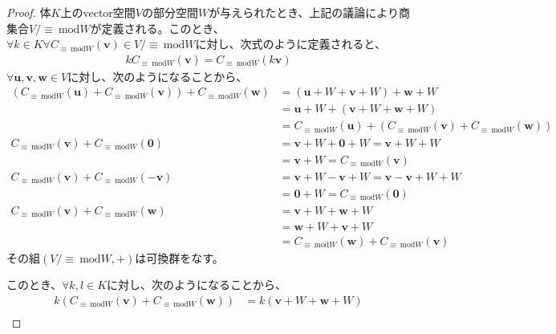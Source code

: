\documentclass[dvipdfmx]{jsarticle}
\begin{document}
\begin{proof}
体$K$上のvector空間$V$の部分空間$W$が与えられたとき、上記の議論により商集合${V}/{\equiv \ \mathrm{mod}W}$が定義される。このとき、$\forall k \in K\forall C_{\equiv \ \mathrm{mod}W}\left( \mathbf{v} \right) \in {V}/{\equiv \ \mathrm{mod}W}$に対し、次式のように定義されると、
\begin{align*}
kC_{\equiv \ \mathrm{mod}W}\left( \mathbf{v} \right) = C_{\equiv \ \mathrm{mod}W}\left( k\mathbf{v} \right)
\end{align*}
$\forall\mathbf{u},\mathbf{v},\mathbf{w} \in V$に対し、次のようになることから、
\begin{align*}
\left( C_{\equiv \ \mathrm{mod}W}\left( \mathbf{u} \right) + C_{\equiv \ \mathrm{mod}W}\left( \mathbf{v} \right) \right) + C_{\equiv \ \mathrm{mod}W}\left( \mathbf{w} \right) &= \left( \mathbf{u} + W + \mathbf{v} + W \right) + \mathbf{w} + W\\
&= \mathbf{u} + W + \left( \mathbf{v} + W + \mathbf{w} + W \right)\\
&= C_{\equiv \ \mathrm{mod}W}\left( \mathbf{u} \right) + \left( C_{\equiv \ \mathrm{mod}W}\left( \mathbf{v} \right) + C_{\equiv \ \mathrm{mod}W}\left( \mathbf{w} \right) \right)\\
C_{\equiv \ \mathrm{mod}W}\left( \mathbf{v} \right) + C_{\equiv \ \mathrm{mod}W}\left( \mathbf{0} \right) &= \mathbf{v} + W + \mathbf{0} + W = \mathbf{v} + W + W\\
&= \mathbf{v} + W = C_{\equiv \ \mathrm{mod}W}\left( \mathbf{v} \right)\\
C_{\equiv \ \mathrm{mod}W}\left( \mathbf{v} \right) + C_{\equiv \ \mathrm{mod}W}\left( - \mathbf{v} \right) &= \mathbf{v} + W - \mathbf{v} + W = \mathbf{v} - \mathbf{v} + W + W\\
&= \mathbf{0} + W = C_{\equiv \ \mathrm{mod}W}\left( \mathbf{0} \right)\\
C_{\equiv \ \mathrm{mod}W}\left( \mathbf{v} \right) + C_{\equiv \ \mathrm{mod}W}\left( \mathbf{w} \right) &= \mathbf{v} + W + \mathbf{w} + W\\
&= \mathbf{w} + W + \mathbf{v} + W\\
&= C_{\equiv \ \mathrm{mod}W}\left( \mathbf{w} \right) + C_{\equiv \ \mathrm{mod}W}\left( \mathbf{v} \right)
\end{align*}
その組$\left( {V}/{\equiv \ \mathrm{mod}W}, + \right)$は可換群をなす。\par
このとき、$\forall k,l \in K$に対し、次のようになることから、
\begin{align*}
k\left( C_{\equiv \ \mathrm{mod}W}\left( \mathbf{v} \right) + C_{\equiv \ \mathrm{mod}W}\left( \mathbf{w} \right) \right) &= k\left( \mathbf{v} + W + \mathbf{w} + W \right)\\

\end{align*}
\end{proof}
\end{document}
